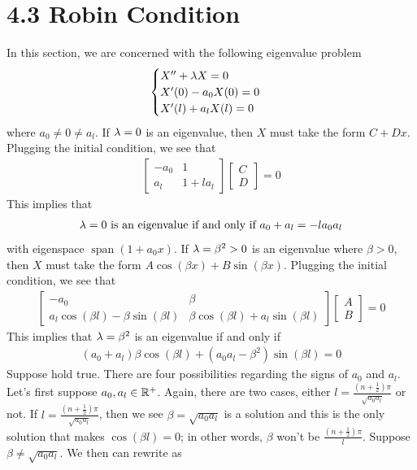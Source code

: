 \documentclass{report}
\begin{document}
\section{4.3 Robin Condition}
\begin{mdframed}
In this section, we are concerned with the following eigenvalue problem 
\begin{align*}
\begin{cases}
  X''+\lambda  X=0 \\
  X'(0)-a_0X(0)=0\\
  X'(l)+a_lX(l)=0
\end{cases}
\end{align*}
where $a_0\neq 0 \neq a_l$. If $\lambda =0$ is an eigenvalue, then $X$ must take the form  $C+Dx$. Plugging the initial condition, we see that 
\begin{align*}
\begin{bmatrix}
  -a_0 & 1\\
  a_l & 1+ l a_l
\end{bmatrix}\begin{bmatrix}
C\\
D
\end{bmatrix}=0
\end{align*}
This implies that 
\begin{align*}
\lambda =0\text{ is an eigenvalue if and only if }a_0+a_l=-la_0a_l
\end{align*}
with eigenspace $\operatorname{span}(1+a_0x)$. If $\lambda =\beta ^2 >0$ is an eigenvalue where $\beta >0$, then $X$ must take the form  $A\cos (\beta x)+B \sin (\beta x)$. Plugging the initial condition, we see that 
\begin{align*}
\begin{bmatrix}
  -a_0 & \beta \\
  a_l \cos (\beta l) - \beta \sin (\beta l) & \beta  \cos (\beta l)+ a_l \sin (\beta l) 
\end{bmatrix}\begin{bmatrix}
A \\
B
\end{bmatrix}=0
\end{align*}
This implies that $\lambda =\beta ^2$ is an eigenvalue if and only if 
\begin{align}
\label{rob1}
  (a_0+a_l)\beta  \cos (\beta l)+ (a_0a_l-\beta ^2)\sin (\beta l)=0
\end{align}
Suppose  hold true. There are four possibilities regarding the signs of $a_0$ and  $a_l$. Let's first suppose  $a_0,a_l\in\mathbb{R}^+$. Again, there are two cases, either $l= \frac{(n+\frac{1}{2})\pi }{\sqrt{a_0a_l} }$ or not. If $l= \frac{(n+\frac{1}{2})\pi }{\sqrt{a_0a_l}}$, then we see $\beta =\sqrt{a_0a_l} $ is a solution and this is the only solution that makes $\cos (\beta l )=0$; in other words, $\beta $ won't be $\frac{(n+\frac{1}{2})\pi }{l}$. Suppose $\beta \neq \sqrt{a_0a_l} $. We then can rewrite  as   

\end{mdframed}
\end{document}
